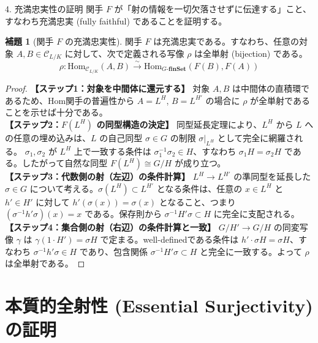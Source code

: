 \documentclass[10pt, unicode]{beamer}
\theoremstyle{definition}
\newtheorem{lem}[thm]{補題}
\begin{document}
\begin{frame}[allowframebreaks]{4. 充満忠実性の証明}
    関手 $F$ が「射の情報を一切欠落させずに伝達する」こと、すなわち充満忠実 (fully faithful) であることを証明する。

    \begin{lem}[関手 $F$ の充満忠実性]
        関手 $F$ は充満忠実である。すなわち、任意の対象 $A, B \in \mathcal{C}_{L/K}$ に対して、次で定義される写像 $\rho$ は全単射 (bijection) である。
        \[ \rho: \mathrm{Hom}_{\mathcal{C}_{L/K}}(A, B) \xrightarrow{\sim} \mathrm{Hom}_{G\text{-}\mathbf{finSet}}(F(B), F(A)) \]
    \end{lem}

    \begin{proof}
        \textbf{【ステップ1：対象を中間体に還元する】}
        対象 $A, B$ は中間体の直積環であるため、Hom関手の普遍性から $A = L^H$, $B = L^{H'}$ の場合に $\rho$ が全単射であることを示せば十分である。\\
        \textbf{【ステップ2：$F(L^H)$ の同型構造の決定】}
        同型延長定理により、$L^H$ から $L$ への任意の埋め込みは、$L$ の自己同型 $\sigma \in G$ の制限 $\sigma|_{L^H}$ として完全に網羅される。
        $\sigma_1, \sigma_2$ が $L^H$ 上で一致する条件は $\sigma_1^{-1}\sigma_2 \in H$、すなわち $\sigma_1 H = \sigma_2 H$ である。したがって自然な同型 $F(L^H) \cong G/H$ が成り立つ。\\
        \textbf{【ステップ3：代数側の射（左辺）の条件計算】}
        $L^H \to L^{H'}$ の準同型を延長した $\sigma \in G$ について考える。$\sigma(L^H) \subset L^{H'}$ となる条件は、任意の $x \in L^H$ と $h' \in H'$ に対して $h'(\sigma(x)) = \sigma(x)$ となること、つまり $(\sigma^{-1} h' \sigma)(x) = x$ である。保存則から $\sigma^{-1} H' \sigma \subset H$ に完全に支配される。\\
        \textbf{【ステップ4：集合側の射（右辺）の条件計算と一致】}
        $G/H' \to G/H$ の同変写像 $\gamma$ は $\gamma(1 \cdot H') = \sigma H$ で定まる。well-definedである条件は $h' \cdot \sigma H = \sigma H$、すなわち $\sigma^{-1}h'\sigma \in H$ であり、包含関係 $\sigma^{-1} H' \sigma \subset H$ と完全に一致する。よって $\rho$ は全単射である。
    \end{proof}
\end{frame}

\section{本質的全射性 (Essential Surjectivity) の証明}
\end{document}
